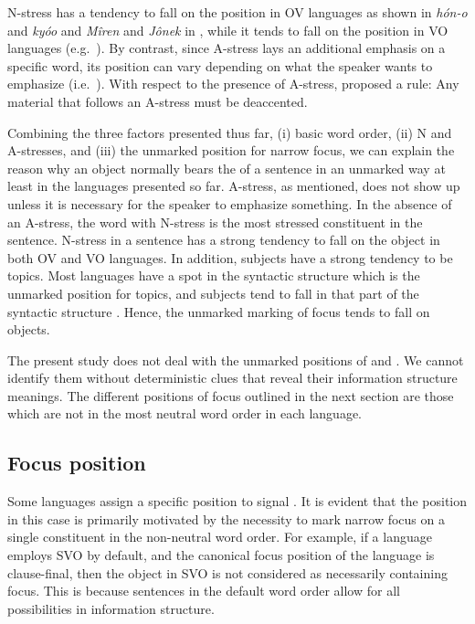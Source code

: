 \noindent N-stress has a tendency to fall on the 
position in OV languages as shown in \textit{h\'on-o} and
\textit{ky{\'o}o}  and \textit{M\^{i}ren} and
\textit{J\^{o}nek} in , while it tends to
fall on the  position in VO languages
(e.g.\ ). By contrast, since A-stress lays an additional
emphasis on a specific word, its position can vary depending on what
the speaker wants to emphasize (i.e.\ ). With respect to the
presence of A-stress, \citeauthor{ishihara:01} proposed a rule: Any
material that follows an A-stress must be deaccented.



Combining the three factors presented thus far, (i) basic word order,
(ii) N and A-stresses, and (iii) the unmarked position for narrow
focus, we can explain the reason why an object normally bears the
 of a sentence in an unmarked way at least in the languages
presented so far.  A-stress, as mentioned, does not show up unless it
is necessary for the speaker to emphasize something.  In the absence
of an A-stress, the word with N-stress is the most stressed
constituent in the sentence.  N-stress in a sentence has a strong
tendency to fall on the object in both OV and VO languages. In
addition, subjects have a strong tendency to be topics. Most languages
have a spot in the syntactic structure which is the unmarked position
for topics, and subjects tend to fall in that part of the syntactic
structure \citep{lambrecht:96}. Hence, the unmarked marking of focus
tends to fall on objects.


The present study does not deal with the unmarked positions of 
and . We cannot identify them without deterministic clues that
reveal their information structure meanings. The different positions
of focus outlined in the next section are those which are not in the
most neutral word order in each language.



\subsection{Focus position}
\label{4:ssec:focus-position}

Some languages assign a specific position to signal . It is
evident that the position in this case is primarily motivated by the
necessity to mark narrow focus on a single constituent in the
non-neutral word order. For example, if a language employs SVO by
default, and the canonical focus position of the language is
clause-final, then the object in SVO is not considered as necessarily
containing focus. This is because sentences in the
default word order allow for all possibilities in information
structure.


